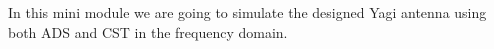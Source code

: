In this mini module we are going to simulate the designed Yagi antenna using both ADS and CST in the frequency domain. 